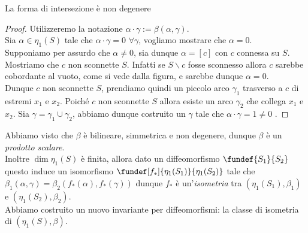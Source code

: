 \begin{teo}
 La forma di intersezione è non degenere
\end{teo}

\begin{proof}
Utilizzeremo la notazione $\alpha \cdot \gamma := \beta(\alpha,\gamma)$. \\
Sia $\alpha \in \eta_1(S)$ tale che $\alpha \cdot \gamma = 0$  $\forall \gamma$, vogliamo mostrare che  $\alpha = 0$. \\
Supponiamo per assurdo che $\alpha \neq 0$, sia dunque $\alpha = [c]$ con $c$ connessa su $S$. \\
Mostriamo che $c$ non sconnette $S$. Infatti se $S \backslash c$ fosse sconnesso allora $c$ sarebbe cobordante al vuoto, come si vede dalla figura, e sarebbe dunque $\alpha = 0$. \\
Dunque $c$ non sconnette $S$, prendiamo quindi un piccolo arco $\gamma_1$ trasverso a $c$ di estremi $x_1$ e $x_2$. Poiché $c$ non sconnette $S$ allora esiste un arco $\gamma_2$ che collega $x_1$ e $x_2$. Sia $\gamma = \gamma_1 \cup \gamma_2$, abbiamo dunque costruito un $\gamma$ tale che $\alpha \cdot \gamma = 1 \neq 0$ \absurd {}.
\end{proof}

\begin{oss}
Abbiamo visto che $\beta$ è bilineare, simmetrica e non degenere, dunque $\beta$ è un \emph{prodotto scalare}. \\
Inoltre $\dim \eta_1(S)$ è finita, allora dato un diffeomorfismo $\fundef{S_1}{S_2}$ questo induce un isomorfismo $\fundef[f_*]{\eta_1(S_1)}{\eta_1(S_2)}$ tale che $\beta_1(\alpha,\gamma) = \beta_2(f_*(\alpha),f_*(\gamma))$ dunque $f_*$ è un'\emph{isometria} tra $(\eta_1(S_1), \beta_1)$ e $(\eta_1(S_2), \beta_2)$. \\
Abbiamo costruito un nuovo invariante per diffeomorfismi: la classe di isometria di $(\eta_1(S), \beta)$.
\end{oss}